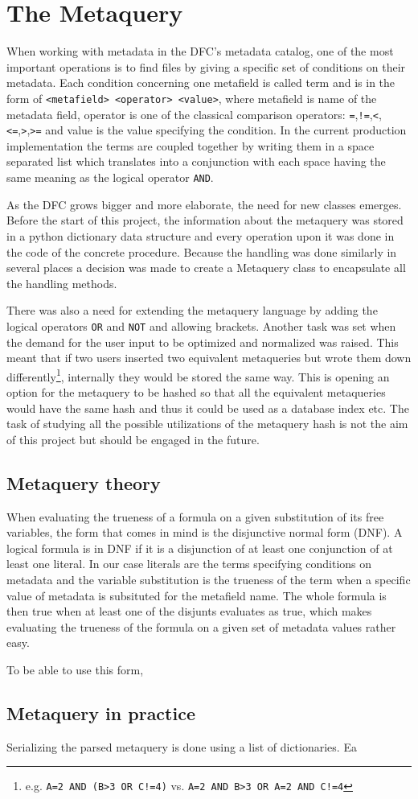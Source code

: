 \chapter{The Metaquery}

When working with metadata in the DFC's metadata catalog, one of the most important operations is 
to find files by giving a specific set of conditions on their metadata. Each condition concerning
one metafield is called term and is in the form of \texttt{<metafield> <operator> <value>}, where
metafield is name of the metadata field, operator is one of the classical comparison operators:
\texttt{=},\texttt{!=},\texttt{<},\texttt{<=},\texttt{>},\texttt{>=} and value is the value
specifying the condition. In the current production implementation the terms are coupled 
together by writing them in a space separated list which translates into a conjunction with
each space having the same meaning as the logical operator \texttt{AND}.

As the DFC grows bigger and more elaborate, the need for new classes emerges. Before the 
start of this project, the information about the metaquery was stored in a python dictionary
data structure and every operation upon it was done in the code of the concrete procedure. 
Because the handling was done similarly in several places a decision was made to create a 
Metaquery class to encapsulate all the handling methods. 

There was also a need for extending the metaquery language by adding the logical operators 
\texttt{OR} and \texttt{NOT} and allowing brackets. Another task was set when the demand for
the user input to be optimized and normalized was raised. This meant that if two users 
inserted two equivalent metaqueries but wrote them down 
differently\footnote{e.g. \texttt{A=2 AND (B>3 OR C!=4)} vs. \texttt{A=2 AND B>3 OR A=2 AND C!=4}}, 
internally they would be stored the same way. This is opening an option for the metaquery 
to be hashed so that all the equivalent metaqueries would have the same hash and thus it 
could be used as a database index etc. The task of studying all the possible utilizations of the 
metaquery hash is not the aim of this project but should be engaged in the future. 

\section{Metaquery theory}

When evaluating the trueness of a formula on a given substitution of its free variables, the 
form that comes in mind is the disjunctive normal form (DNF). A logical formula is in DNF if
it is a disjunction of at least one conjunction of at least one literal. In our case literals 
are the terms specifying conditions on metadata and the variable substitution is the trueness
of the term when a specific value of metadata is subsituted for the metafield name. The whole
formula is then true when at least one of the disjunts evaluates as true, which makes evaluating
the trueness of the formula on a given set of metadata values rather easy.

To be able to use this form, 

\section{Metaquery in practice}
Serializing the parsed metaquery is done using a list of dictionaries. Ea